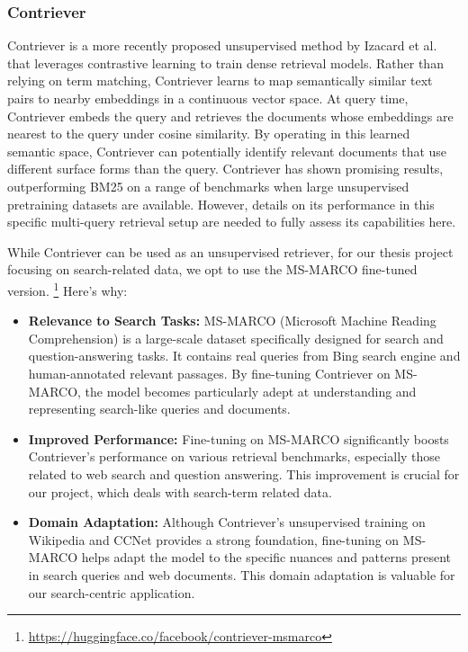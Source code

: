 \subsubsection{Contriever}
Contriever is a more recently proposed unsupervised method by Izacard et al.\cite{izacard2022unsuperviseddenseinformationretrieval} that leverages contrastive learning to train dense retrieval models.
Rather than relying on term matching, Contriever learns to map semantically similar text pairs to nearby embeddings in a continuous vector space.
At query time, Contriever embeds the query and retrieves the documents whose embeddings are nearest to the query under cosine similarity.
By operating in this learned semantic space, Contriever can potentially identify relevant documents that use different surface forms than the query.
Contriever has shown promising results, outperforming BM25 on a range of benchmarks when large unsupervised pretraining datasets are available.
However, details on its performance in this specific multi-query retrieval setup are needed to fully assess its capabilities here.

While Contriever can be used as an unsupervised retriever, for our thesis project focusing on search-related data, we opt to use the MS-MARCO fine-tuned version. \footnote{\url{https://huggingface.co/facebook/contriever-msmarco}}
Here's why:
\begin{itemize}
    \item \textbf{Relevance to Search Tasks:} MS-MARCO (Microsoft Machine Reading Comprehension) is a large-scale dataset specifically designed for search and question-answering tasks. It contains real queries from Bing search engine and human-annotated relevant passages. By fine-tuning Contriever on MS-MARCO, the model becomes particularly adept at understanding and representing search-like queries and documents.
    \item \textbf{Improved Performance:} Fine-tuning on MS-MARCO significantly boosts Contriever's performance on various retrieval benchmarks, especially those related to web search and question answering. This improvement is crucial for our project, which deals with search-term related data.
    \item \textbf{Domain Adaptation:} Although Contriever's unsupervised training on Wikipedia and CCNet provides a strong foundation, fine-tuning on MS-MARCO helps adapt the model to the specific nuances and patterns present in search queries and web documents. This domain adaptation is valuable for our search-centric application.
\end{itemize}

